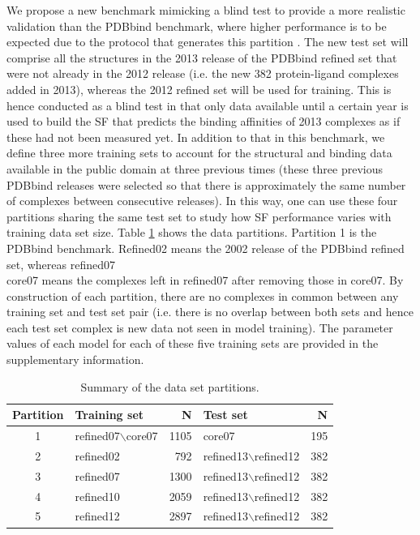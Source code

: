 We propose a new benchmark mimicking a blind test to provide a more realistic validation than the PDBbind benchmark, where higher performance is to be expected due to the protocol that generates this partition \citep{908}. The new test set will comprise all the structures in the 2013 release of the PDBbind refined set that were not already in the 2012 release (i.e. the new 382 protein-ligand complexes added in 2013), whereas the 2012 refined set will be used for training. This is hence conducted as a blind test in that only data available until a certain year is used to build the SF that predicts the binding affinities of 2013 complexes as if these had not been measured yet. In addition to that in this benchmark, we define three more training sets to account for the structural and binding data available in the public domain at three previous times (these three previous PDBbind releases were selected so that there is approximately the same number of complexes between consecutive releases). In this way, one can use these four partitions sharing the same test set to study how SF performance varies with training data set size. Table \ref{rfscore3:partitions} shows the data partitions. Partition 1 is the PDBbind benchmark. Refined02 means the 2002 release of the PDBbind refined set, whereas refined07\\core07 means the complexes left in refined07 after removing those in core07. By construction of each partition, there are no complexes in common between any training set and test set pair (i.e. there is no overlap between both sets and hence each test set complex is new data not seen in model training). The parameter values of each model for each of these five training sets are provided in the supplementary information.

\begin{table}
\caption{Summary of the data set partitions.}
\label{rfscore3:partitions}
\begin{tabular}{clrlr}
\hline
Partition & Training set & N & Test set & N\\
\hline
1 & refined07$\backslash$core07 & 1105 & core07               & 195\\
2 & refined02         &  792 & refined13$\backslash$refined12 & 382\\
3 & refined07         & 1300 & refined13$\backslash$refined12 & 382\\
4 & refined10         & 2059 & refined13$\backslash$refined12 & 382\\
5 & refined12         & 2897 & refined13$\backslash$refined12 & 382\\
\hline
\end{tabular}
\end{table}

